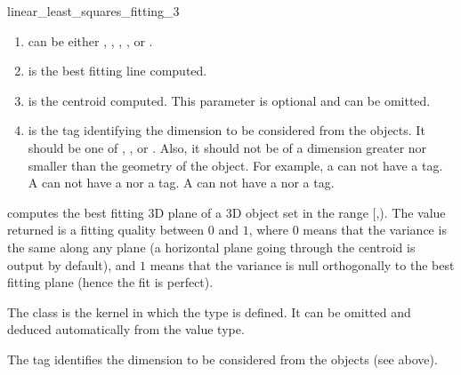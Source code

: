\begin{ccRefFunction}{linear_least_squares_fitting_3}
\begin{enumerate}
   \item  {} can be either , 
          , , ,
           or .
   \item  {} is the best fitting line computed.
   \item  {} is the centroid computed. This parameter is optional and can be omitted.
   \item  {} is the tag identifying the dimension to be considered from the objects. It should be one of , ,  or . Also, it should not be of a dimension greater nor smaller than the geometry of the object. For example, a  can not have a  tag. A  can not have a  nor a  tag. A  can not have a  nor a  tag.
\end{enumerate}


{ computes the best fitting 3D plane of a 3D object set in the range
[,). The value returned is a fitting quality
between $0$ and $1$, where $0$ means that the variance is the same
along any plane (a horizontal plane going through the centroid is output
by default), and $1$ means that the variance is null orthogonally
to the best fitting plane (hence the fit is perfect). }

The class  is the kernel in which the type  is defined. It can be omitted and deduced automatically from the value type.

The tag  identifies the dimension to be considered from the objects (see above).



\end{ccRefFunction}
